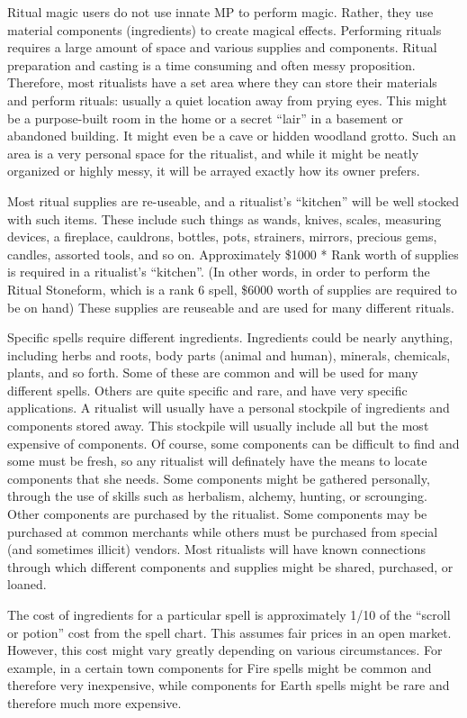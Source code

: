 Ritual magic users do not use innate MP to perform magic.  Rather,
they use material components (ingredients) to create magical effects.
Performing rituals requires a large amount of space and various
supplies and components. Ritual preparation and casting is a time
consuming and often messy proposition.  Therefore, most ritualists
have a set area where they can store their materials and perform
rituals: usually a quiet location away from prying eyes.  This might
be a purpose-built room in the home or a secret ``lair'' in a basement
or abandoned building.  It might even be a cave or hidden woodland
grotto.  Such an area is a very personal space for the ritualist, and
while it might be neatly organized or highly messy, it will be arrayed
exactly how its owner prefers.

Most ritual supplies are re-useable, and a ritualist's ``kitchen''
will be well stocked with such items.  These include such things as
wands, knives, scales, measuring devices, a fireplace, cauldrons,
bottles, pots, strainers, mirrors, precious gems, candles, assorted
tools, and so on.  Approximately \$1000 * Rank worth of supplies is
required in a ritualist's ``kitchen''.  (In other words, in order to
perform the Ritual Stoneform, which is a rank 6 spell, \$6000 worth of
supplies are required to be on hand) These supplies are reuseable and
are used for many different rituals.

Specific spells require different ingredients.  Ingredients could be
nearly anything, including herbs and roots, body parts (animal and
human), minerals, chemicals, plants, and so forth.  Some of these are
common and will be used for many different spells.  Others are quite
specific and rare, and have very specific applications.  A ritualist
will usually have a personal stockpile of ingredients and components
stored away.  This stockpile will usually include all but the most
expensive of components.  Of course, some components can be difficult
to find and some must be fresh, so any ritualist will definately have
the means to locate components that she needs.  Some components might
be gathered personally, through the use of skills such as herbalism,
alchemy, hunting, or scrounging.  Other components are purchased by
the ritualist.  Some components may be purchased at common merchants
while others must be purchased from special (and sometimes illicit)
vendors.  Most ritualists will have known connections through which
different components and supplies might be shared, purchased, or
loaned.

The cost of ingredients for a particular spell is approximately 1/10
of the ``scroll or potion'' cost from the spell chart. This assumes
fair prices in an open market.  However, this cost might vary greatly
depending on various circumstances.  For example, in a certain town
components for Fire spells might be common and therefore very
inexpensive, while components for Earth spells might be rare and
therefore much more expensive.

